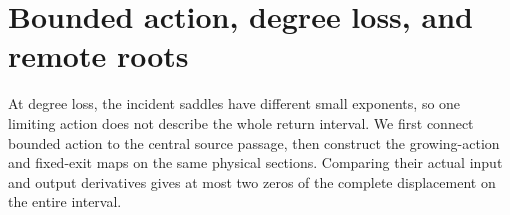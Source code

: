\section{Bounded action, degree loss, and remote roots}
\label{sec:degree-loss-remote-roots}

At degree loss, the incident saddles have different small exponents, so
one limiting action does not describe the whole return interval. We first
connect bounded action to the central source passage, then construct the
growing-action and fixed-exit maps on the same physical sections.
Comparing their actual input and output derivatives gives at most two
zeros of the complete displacement on the entire interval.


